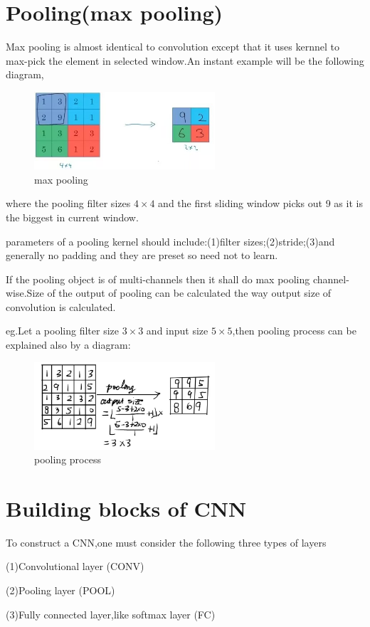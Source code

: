 \documentclass{article}
\begin{document}
\section{Pooling(max pooling)}
Max pooling is almost identical to convolution except that it uses kernnel to max-pick the element in selected window.An instant example will be the following diagram,
\begin{figure}[htbp]
	\centering
	\includegraphics[width=0.6\textwidth]{3.jpg}
	\caption{max pooling}
\end{figure}
where the pooling filter sizes $4\times4$ and the first sliding window picks out 9 as it is the biggest in current window.
\par parameters of a pooling kernel should include:(1)filter sizes;(2)stride;(3)and generally no padding and they are preset so need not to learn.
\par If the pooling object is of multi-channels then it shall do max pooling channel-wise.Size of the output of pooling can be calculated the way output size of convolution is calculated.
\par eg.Let a pooling filter size $3\times3$ and input size $5\times5$,then pooling process can be explained also by a diagram:
\begin{figure}[htbp]
	\centering
	\includegraphics[width=0.6\textwidth]{4.jpg}
	\caption{pooling process}
\end{figure}
\section{Building blocks of CNN}
To construct a CNN,one must consider the following three types of layers
\par (1)Convolutional layer (CONV)
\par (2)Pooling layer (POOL)
\par (3)Fully connected layer,like softmax layer (FC)
\end{document}
